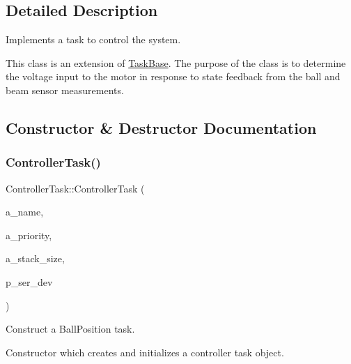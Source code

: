 \subsection{Detailed Description}
Implements a task to control the system. 

This class is an extension of {\ttfamily \mbox{\hyperlink{class_task_base}{Task\+Base}}}. The purpose of the class is to determine the voltage input to the motor in response to state feedback from the ball and beam sensor measurements. 

\subsection{Constructor \& Destructor Documentation}
\mbox{\label{class_controller_task_a2b2914fa356737e69e9ec1e3ffd3a8e3}} 
\subsubsection{\texorpdfstring{Controller\+Task()}{ControllerTask()}}
{\footnotesize\ttfamily Controller\+Task\+::\+Controller\+Task (\begin{DoxyParamCaption}\item[{const char $\ast$}]{a\+\_\+name,  }\item[{unsigned port\+B\+A\+S\+E\+\_\+\+T\+Y\+PE}]{a\+\_\+priority,  }\item[{size\+\_\+t}]{a\+\_\+stack\+\_\+size,  }\item[{\mbox{\hyperlink{classemstream}{emstream}} $\ast$}]{p\+\_\+ser\+\_\+dev }\end{DoxyParamCaption})}



Construct a Ball\+Position task. 

Constructor which creates and initializes a controller task object.

